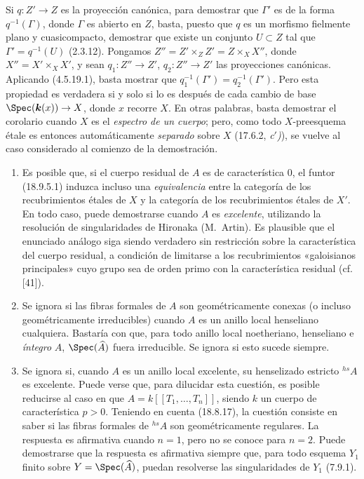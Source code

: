 Si $q:Z'\to Z$ es la proyección canónica, para demostrar que $\Gamma'$ es de la forma $q^{-1}(\Gamma)$, donde $\Gamma$ es abierto en $Z$, basta, puesto que $q$ es un morfismo fielmente plano y cuasicompacto, demostrar que existe un conjunto $U\subset Z$ tal que $\Gamma'=q^{-1}(U)$ (2.3.12). Pongamos $Z''=Z'\times_Z Z'=Z\times_X X''$, donde $X''=X'\times_X X'$, y sean $q_1:Z''\to Z'$, $q_2:Z''\to Z'$ las proyecciones canónicas. Aplicando (4.5.19.1), basta mostrar que $q_1^{-1}(\Gamma')=q_2^{-1}(\Gamma')$. Pero esta propiedad es verdadera si y solo si lo es después de cada cambio de base $\Spec(\boldsymbol{k}(x))\to X$, donde $x$ recorre $X$. En otras palabras, basta demostrar el corolario cuando $X$ es el \emph{espectro de un cuerpo}; pero, como todo $X$-preesquema étale es entonces automáticamente \emph{separado} sobre $X$ (17.6.2, \emph{c$'$)}), se vuelve al caso considerado al comienzo de la demostración.

\begin{remarks}[18.9.6]
\label{IV.18.9.6}
\begin{enumerate}
  \item[(i)] Es posible que, si el cuerpo residual de $A$ es de característica 0, el funtor (18.9.5.1) induzca incluso una \emph{equivalencia} entre la categoría de los recubrimientos étales de $X$ y la categoría de los recubrimientos étales de $X'$. En todo caso, puede demostrarse cuando $A$ es \emph{excelente}, utilizando la resolución de singularidades de Hironaka (M.~Artin). Es plausible que el enunciado análogo siga siendo verdadero sin restricción sobre la característica del cuerpo residual, a condición de limitarse a los recubrimientos «galoisianos principales» cuyo grupo sea de orden primo con la característica residual (cf. [41]).


  \item[(ii)] Se ignora si las fibras formales de $A$ son geométricamente conexas (o incluso geométricamente irreducibles) cuando $A$ es un anillo local henseliano cualquiera. Bastaría con que, para todo anillo local noetheriano, henseliano e \emph{íntegro} $A$, $\Spec(\widehat A)$ fuera irreducible. Se ignora si esto sucede siempre.

  \item[(iii)] Se ignora si, cuando $A$ es un anillo local excelente, su henselizado estricto ${}^{hs}\!A$ es excelente. Puede verse que, para dilucidar esta cuestión, es posible reducirse al caso en que $A=k[[T_1,\ldots,T_n]]$, siendo $k$ un cuerpo de característica $p>0$. Teniendo en cuenta (18.8.17), la cuestión consiste en saber si las fibras formales de ${}^{hs}\!A$ son geométricamente regulares. La respuesta es afirmativa cuando $n=1$, pero no se conoce para $n=2$. Puede demostrarse que la respuesta es afirmativa siempre que, para todo esquema $Y_1$ finito sobre $Y=\Spec(\widehat A)$, puedan resolverse las singularidades de $Y_1$ (7.9.1).
\end{enumerate}
\end{remarks}

